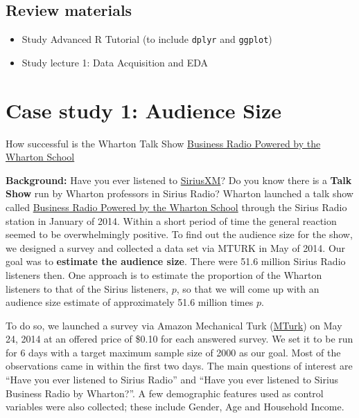 \documentclass[
]{article}
\providecommand{\tightlist}{%
  \setlength{\itemsep}{0pt}\setlength{\parskip}{0pt}}
\begin{document}
\hypertarget{review-materials}{%
\subsection{Review materials}\label{review-materials}}

\begin{itemize}
\tightlist
\item
  Study Advanced R Tutorial (to include \texttt{dplyr} and
  \texttt{ggplot})
\item
  Study lecture 1: Data Acquisition and EDA
\end{itemize}

\hypertarget{case-study-1-audience-size}{%
\section{Case study 1: Audience Size}\label{case-study-1-audience-size}}

How successful is the Wharton Talk Show
\href{https://businessradio.wharton.upenn.edu/}{Business Radio Powered
by the Wharton School}

\textbf{Background:} Have you ever listened to
\href{https://www.siriusxm.com/}{SiriusXM}? Do you know there is a
\textbf{Talk Show} run by Wharton professors in Sirius Radio? Wharton
launched a talk show called
\href{https://businessradio.wharton.upenn.edu/}{Business Radio Powered
by the Wharton School} through the Sirius Radio station in January of
2014. Within a short period of time the general reaction seemed to be
overwhelmingly positive. To find out the audience size for the show, we
designed a survey and collected a data set via MTURK in May of 2014. Our
goal was to \textbf{estimate the audience size}. There were 51.6 million
Sirius Radio listeners then. One approach is to estimate the proportion
of the Wharton listeners to that of the Sirius listeners, \(p\), so that
we will come up with an audience size estimate of approximately 51.6
million times \(p\).

To do so, we launched a survey via Amazon Mechanical Turk
(\href{https://www.mturk.com/}{MTurk}) on May 24, 2014 at an offered
price of \$0.10 for each answered survey. We set it to be run for 6 days
with a target maximum sample size of 2000 as our goal. Most of the
observations came in within the first two days. The main questions of
interest are ``Have you ever listened to Sirius Radio'' and ``Have you
ever listened to Sirius Business Radio by Wharton?''. A few demographic
features used as control variables were also collected; these include
Gender, Age and Household Income.
\end{document}
